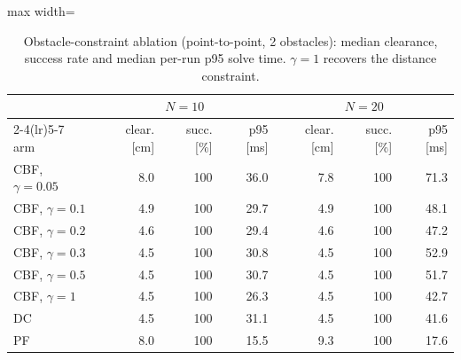 \begin{table}[!htbp]
\centering\small
\caption{Obstacle-constraint ablation (point-to-point, 2 obstacles): median clearance, success rate and median per-run p95 solve time. $\gamma=1$ recovers the distance constraint.}\label{tab:gamma}
\begin{adjustbox}{max width=\linewidth}
\begin{tabular}{lrrrrrr}
\toprule
& \multicolumn{3}{c}{$N=10$} & \multicolumn{3}{c}{$N=20$} \\
\cmidrule(lr){2-4}\cmidrule(lr){5-7}
arm & clear. [cm] & succ. [\%] & p95 [ms] & clear. [cm] & succ. [\%] & p95 [ms] \\
\midrule
CBF, $\gamma=0.05$ & 8.0 & 100 & 36.0 & 7.8 & 100 & 71.3 \\
CBF, $\gamma=0.1$ & 4.9 & 100 & 29.7 & 4.9 & 100 & 48.1 \\
CBF, $\gamma=0.2$ & 4.6 & 100 & 29.4 & 4.6 & 100 & 47.2 \\
CBF, $\gamma=0.3$ & 4.5 & 100 & 30.8 & 4.5 & 100 & 52.9 \\
CBF, $\gamma=0.5$ & 4.5 & 100 & 30.7 & 4.5 & 100 & 51.7 \\
CBF, $\gamma=1$ & 4.5 & 100 & 26.3 & 4.5 & 100 & 42.7 \\
DC & 4.5 & 100 & 31.1 & 4.5 & 100 & 41.6 \\
PF & 8.0 & 100 & 15.5 & 9.3 & 100 & 17.6 \\
\bottomrule
\end{tabular}
\end{adjustbox}
\end{table}
